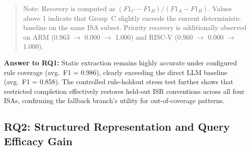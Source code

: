 \documentclass[a4paper,UKenglish,cleveref, autoref, thm-restate]{lipics-v2021}
\begin{document}
\begin{table}[t]
  \centering
  \caption{RQ1 supplementary controlled rule-holdout stress test on ISR identification. FRB: full rule base; B: held-out static only; HORC: held-out + restricted completion.}
  \label{tab:rq1_holdout}
  \begin{quote}
    \footnotesize
    Note: Recovery is computed as $(F1_C - F1_B) / (F1_A - F1_B)$. Values above 1 indicate that Group~C slightly exceeds the current deterministic baseline on the same ISA subset. Priority recovery is additionally observed on ARM (0.963 $\rightarrow$ 0.000 $\rightarrow$ 1.000) and RISC-V (0.960 $\rightarrow$ 0.000 $\rightarrow$ 1.000).
  \end{quote}
\end{table}

\begin{rqbox}
\textbf{Answer to RQ1:}
Static extraction remains highly accurate under configured rule coverage (avg.\ F1 = 0.986), clearly exceeding the direct LLM baseline (avg.\ F1 = 0.858). The controlled rule-holdout stress test further shows that restricted completion effectively restores held-out ISR conventions across all four ISAs, confirming the fallback branch's utility for out-of-coverage patterns.
\end{rqbox}


\subsection{RQ2: Structured Representation and Query Efficacy Gain}
\end{document}
